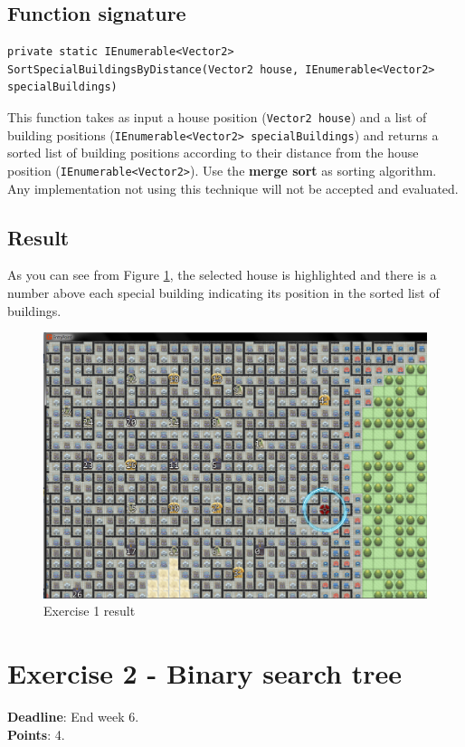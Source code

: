 \documentclass[10pt,a4paper]{article}
\begin{document}
\subsection*{Function signature} 
\begin{lstlisting}
private static IEnumerable<Vector2> SortSpecialBuildingsByDistance(Vector2 house, IEnumerable<Vector2> specialBuildings)
\end{lstlisting}

This function takes as input a house position (\texttt{Vector2 house}) and a list of building positions (\texttt{IEnumerable<Vector2> specialBuildings}) and returns a sorted list of building positions according to their distance from the house position (\texttt{IEnumerable<Vector2>}). Use the \textbf{merge sort} as sorting algorithm. Any implementation not using this technique will not be accepted and evaluated.

\subsection*{Result}
As you can see from Figure \ref{img:Ex1}, the selected house is highlighted and there is a number above each special building indicating its position in the sorted list of buildings. 

\begin{figure}[!h]
\centering
\includegraphics[scale=0.3]{img/exercise1}
\caption{Exercise 1 result}
\label{img:Ex1}
\end{figure}


\section*{Exercise 2 - Binary search tree}
\textbf{Deadline}: End week 6. \\
\textbf{Points}: 4.
\end{document}
